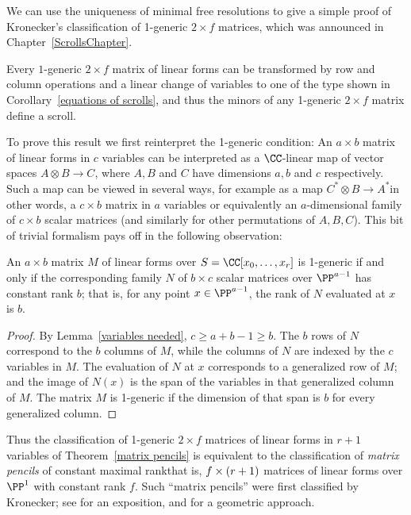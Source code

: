We can use the uniqueness of minimal free resolutions to give a simple
%
proof of Kronecker's classification of 1-generic $2\times f$
%
matrices, which was announced in Chapter~\ref{ScrollsChapter}.

\begin{theorem}\label{matrix pencils}
Every
$1$-generic $2 \times f$ matrix of linear forms can be transformed by
row and column operations and a linear change
of variables to one of the type shown in
Corollary~\ref{equations of scrolls}, and thus the minors of any 1-generic
$2 \times f$ matrix define a scroll.
\unif
\end{theorem}

To prove this result we first reinterpret the 1-generic condition:
An
$a\times b$ matrix of linear forms in $c$ variables can be interpreted as a
$\CC$-linear map of vector spaces
$A \otimes B \to C$, where $A, B$ and $C$ have dimensions $a,b$ and $c$
respectively. Such a map
can be viewed in several ways, for example as a map $C^{*} \otimes B\to
A^{*}$\emdash in other words, a $c\times b$ matrix in $a$ variables\emdash
or equivalently an $a$-dimensional family of $c\times b$ scalar matrices (and
similarly for other permutations of $A,B,C$).
This bit of trivial formalism pays off in the following observation:

\begin{proposition}\label{reinterpretation of 1-generic}
An  $a\times b$ matrix $M$ of linear forms  over $S = \CC[x_{0},\dots, x_{r}]$
is 1-generic if and only if
the corresponding family $N$ of $b\times c$ scalar matrices over $\PP^{a-1}$
 has constant rank $b$; that is,
for any point $x \in \PP^{a-1}$, the rank of $N$ evaluated at $x$ is $b$.
\unif
\end{proposition}

\begin{proof}
By Lemma~\ref{variables needed},  $c \geq a+b-1 \geq b$.
 The $b$ rows of $N$ correspond to the $b$ columns of $M$, while the
columns of $N$ are indexed
by the $c$ variables in $M$. The
evaluation of $N$ at $x$ corresponds to a generalized row of $M$;
and the image of $N(x)$
is the span of the variables in that generalized column of $M$. The matrix $M$
is 1-generic if the dimension
of that span is $b$ for every generalized column.
\end{proof}

Thus the classification of 1-generic $2\times f$ matrices of linear
forms in $r+1$ variables of Theorem~\ref{matrix pencils} is equivalent
to the classification
of \emph{matrix pencils} of constant maximal rank\emdash that is, $f \times
\index{matrix pencil}%
(r+1)$ matrices of linear forms over $\PP^{1}$ with constant rank $f$.
Such ``matrix pencils'' were first classified by Kronecker; see
%
\cite[Chapter 12]{Gantmacher} for an exposition, and
\cite{Eisenbud-Harris-Centennial} for a geometric approach.

